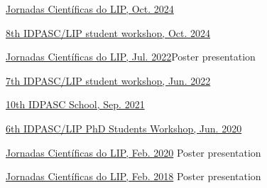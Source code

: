\begin{cventries}

{\href{https://indico.lip.pt/event/1744/}{Jornadas Científicas do LIP, Oct. 2024}}{}

{\href{https://indico.lip.pt/event/1745/}{8th IDPASC/LIP student workshop, Oct. 2024}}{}

{\href{https://indico.lip.pt/event/1183/}{Jornadas Científicas do LIP, Jul. 2022}}{Poster presentation}

{\href{https://indico.lip.pt/event/1245/}{7th IDPASC/LIP student workshop, Jun. 2022}}{}

{}{\href{https://indico.lip.pt/event/643}{10th IDPASC School, Sep. 2021}}{}

{}{\href{https://indico.lip.pt/event/699/}{6th IDPASC/LIP PhD Students Workshop, Jun. 2020}}
{}

{}{\href{https://indico.lip.pt/event/650/}{Jornadas Científicas do LIP, Feb. 2020}}
{Poster presentation}

{}{\href{https://indico.lip.pt/event/359/}{Jornadas Científicas do LIP, Feb. 2018}}
{Poster presentation} 

\end{cventries}